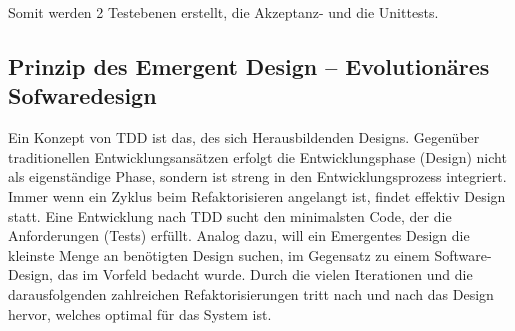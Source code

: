   Somit werden 2 Testebenen erstellt, die Akzeptanz- und die Unittests.


\subsection{Prinzip des Emergent Design -- Evolutionäres Sofwaredesign}
Ein Konzept von TDD ist das, des sich Herausbildenden Designs. Gegenüber traditionellen Entwicklungsansätzen erfolgt die Entwicklungsphase (Design) nicht als eigenständige Phase, sondern ist streng in den Entwicklungsprozess integriert. Immer wenn ein Zyklus beim Refaktorisieren angelangt ist, findet effektiv Design statt. Eine Entwicklung nach TDD sucht den minimalsten Code, der die Anforderungen (Tests) erfüllt. Analog dazu, will ein Emergentes Design die kleinste Menge an benötigten Design suchen, im Gegensatz zu einem Software-Design, das im Vorfeld bedacht wurde. Durch die vielen Iterationen und die darausfolgenden zahlreichen Refaktorisierungen tritt nach und nach das Design hervor, welches optimal für das System ist. 













